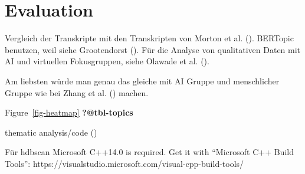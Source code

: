 \documentclass[
  letterpaper,
  DIV=11,
  numbers=noendperiod]{scrartcl}
\begin{document}
\section{Evaluation}\label{sec-evaluation}

Vergleich der Transkripte mit den Transkripten von Morton et al.
().
BERTopic benutzen, weil siehe Grootendorst
(). Für die Analyse von
qualitativen Daten mit AI und virtuellen Fokusgruppen, siehe Olawade et
al. ().

Am liebsten würde man genau das gleiche mit AI Gruppe und menschlicher
Gruppe wie bei Zhang et al.
() machen.

Figure~\ref{fig-heatmap} \textbf{?@tbl-topics}

thematic analysis/code ()

Für hdbscan Microsoft C++14.0 is required. Get it with ``Microsoft C++
Build Tools'':
https://visualstudio.microsoft.com/visual-cpp-build-tools/
\end{document}
